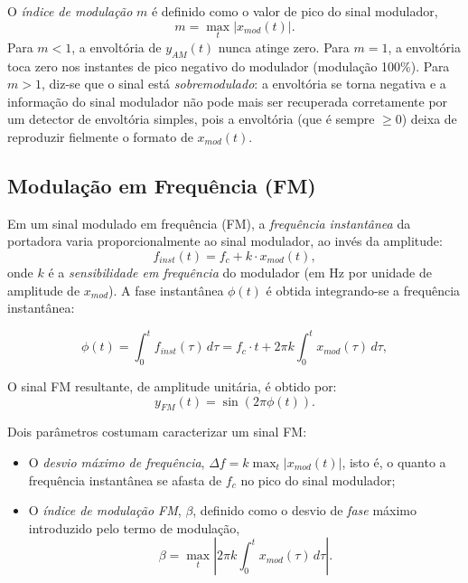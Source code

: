 \documentclass[a4paper,twoside,12pt]{article}
\begin{document}
	O \emph{índice de modulação} $m$ é definido como o valor de pico do sinal modulador,
	\begin{equation}
		m = \max_t \left| x_{mod}(t) \right|.
	\end{equation}
	Para $m<1$, a envoltória de $y_{AM}(t)$ nunca atinge zero. Para $m=1$, a envoltória toca zero nos instantes de pico negativo do modulador (modulação 100\%). Para $m>1$, diz-se que o sinal está \emph{sobremodulado}: a envoltória se torna negativa e a informação do sinal modulador não pode mais ser recuperada corretamente por um detector de envoltória simples, pois a envoltória (que é sempre $\geq 0$) deixa de reproduzir fielmente o formato de $x_{mod}(t)$.
	
	
	\subsection{Modulação em Frequência (FM)}
	\label{sec:FM}
	
	Em um sinal modulado em frequência (FM), a \emph{frequência instantânea} da portadora varia proporcionalmente ao sinal modulador, ao invés da amplitude:
	\begin{equation}
		f_{inst}(t) = f_c + k \cdot x_{mod}(t),
		\label{eq:finst}
	\end{equation}
	onde $k$ é a \emph{sensibilidade em frequência} do modulador (em Hz por unidade de amplitude de $x_{mod}$). A fase instantânea $\phi(t)$ é obtida integrando-se a frequência instantânea:
	
	\begin{equation}
		\phi(t) = \int_0^t f_{inst}(\tau)\, d\tau = f_c \cdot t + 2\pi k \int_0^t x_{mod}(\tau)\, d\tau,
	\end{equation}
	
	O sinal FM resultante, de amplitude unitária, é obtido por:
	\begin{equation}
		y_{FM}(t) = \sin\left( 2\pi \phi(t) \right).
		\label{eq:FM}
	\end{equation}
	
	Dois parâmetros costumam caracterizar um sinal FM:
	\begin{itemize}
		\item O \emph{desvio máximo de frequência}, $\Delta f = k \max_t |x_{mod}(t)|$, isto é, o quanto a frequência instantânea se afasta de $f_c$ no pico do sinal modulador;
		\item O \emph{índice de modulação FM}, $\beta$, definido como o desvio de \emph{fase} máximo introduzido pelo termo de modulação,
		\begin{equation}
			\beta = \max_t \left| 2\pi k \int_0^t x_{mod}(\tau)\, d\tau \right|.
		\end{equation}
	\end{itemize}
	
\end{document}
